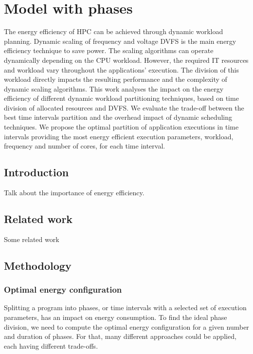 
\section{Model with phases}

The energy efficiency of HPC can be achieved through dynamic workload planning. Dynamic scaling of frequency and voltage DVFS is the main energy efficiency technique to save power. The scaling algorithms can operate dynamically depending on the CPU workload. However, the required IT resources and workload vary throughout the applications' execution. The division of this workload directly impacts the resulting performance and the complexity of dynamic scaling algorithms. This work analyses the impact on the energy efficiency of different dynamic workload partitioning techniques, based on time division of allocated resources and DVFS. We evaluate the trade-off between the best time intervals partition and the overhead impact of dynamic scheduling techniques. We propose the optimal partition of application executions in time intervals providing the most energy efficient execution parameters, workload, frequency and number of cores, for each time interval.

\subsection{Introduction}
Talk about the importance of energy efficiency.

\subsection{Related work}
Some related work

\subsection{Methodology}

\subsubsection{Optimal energy configuration}
Splitting a program into phases, or time intervals with a selected set of execution parameters, has an impact on energy consumption. To find the ideal phase division, we need to compute the optimal energy configuration for a given number and duration of phases. For that, many different approaches could be applied, each having different trade-offs. 

